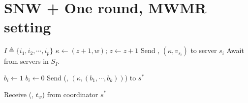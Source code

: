 \section{SNW + One round, MWMR setting}
\label{app:algrithmC}
\begin{algorithm*}[!ht]
  \begin{algorithmic}[2]
  
    \begin{multicols}{3}{\footnotesize
          \EndPart
          \State $I\triangleq \{i_1, i_2, \cdots, i_p \}$
        \Part{ \underline{\writeValue}} {
                \State ${\kappa} \leftarrow (z +1,  w)$; $z \leftarrow z +1 $
            \State Send \writeValueTag, $({\kappa}, v_{s_i})$ to server $s_i$
           \EndFor 
          \State  Await {\ackTag} from servers in  $S_I$.
        }\EndPart
        \Statex
            \Part{ \underline{\informSerializer}} {

             \State $b_i \leftarrow 1$
             \Else
               \State $b_i \leftarrow 0$
            \EndIf
           \EndFor 
                                            \State  Send  (\informSerializerTag, $({\kappa}, (b_{1}, \cdots, b_{k}))$) to   $s^*$

          \State Receive ({\ackTag}, $t_w$) from  coordinator $s^*$
        }\EndPart
      }\end{multicols}
  

\end{algorithmic}
\end{algorithm*}
